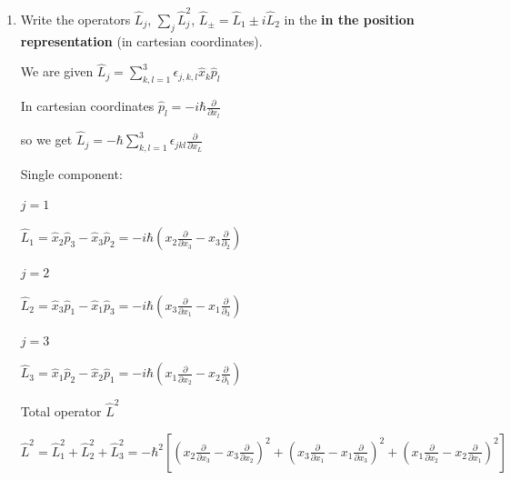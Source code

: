 \documentclass[11pt,a4paper]{scrartcl}
\begin{document}
        \begin{enumerate}
            \item 
                Write the operators $\hat{L}_j$, $\sum\limits_j\hat{L}^2_j$, $\hat{L}_\pm = \hat{L}_1 \pm i \hat{L}_2$ in the \textbf{in the position representation} (in cartesian coordinates).
                \begin{calculationbox}
                    We are given $\hat{L}_j = \sum\limits_{k, l = 1}^3 \epsilon_{j,k,l}\hat{x}_k \hat{p}_l$

                    In cartesian coordinates $\hat{p}_l = - i \hbar \frac{\partial}{\partial x_l}$

                    so we get $\hat{L}_j = - \hbar \sum\limits_{k,l = 1}^3 \epsilon_{jkl} \frac{\partial}{\partial x_L}$

                    Single component:

                    $j = 1$
                    \begin{calculationbox}
                        $\hat{L}_1 = \hat{x}_2 \hat{p}_3 - \hat{x}_3 \hat{p}_2 = - i \hbar (x_2 \frac{\partial}{\partial x_3} - x_3 \frac{\partial}{\partial_2})$
                    \end{calculationbox}

                    $j = 2$
                    \begin{calculationbox}
                        $\hat{L}_2 = \hat{x}_3 \hat{p}_1 - \hat{x}_1 \hat{p}_3 = - i \hbar (x_3 \frac{\partial}{\partial x_1} - x_1 \frac{\partial}{\partial_3})$
                    \end{calculationbox}

                    $j = 3$
                    \begin{calculationbox}
                        $\hat{L}_3 = \hat{x}_1 \hat{p}_2 - \hat{x}_2 \hat{p}_1 = - i \hbar (x_1 \frac{\partial}{\partial x_2} - x_2 \frac{\partial}{\partial_1})$
                    \end{calculationbox}

                    Total operator $\hat{L}^2$
                    \begin{calculationbox}
                        $\hat{L}^2 = \hat{L}_1^2 + \hat{L}_2^2 + \hat{L}_3^2 = -\hbar^2 
                        [ (x_2 \frac{\partial}{\partial x_3} - x_3 \frac{\partial}{\partial x_2})^2 
                        + (x_3 \frac{\partial}{\partial x_1} - x_1 \frac{\partial}{\partial x_3})^2 
                        + (x_1 \frac{\partial}{\partial x_2} - x_2 \frac{\partial}{\partial x_1})^2]$
                    \end{calculationbox}


\end{calculationbox}
\end{enumerate}
\end{document}
